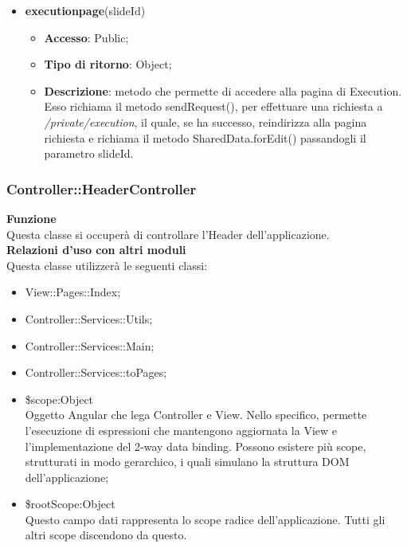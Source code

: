 {{{\begin{itemize}
				\item \textbf{executionpage}(slideId)
				\begin{itemize}
					\item \textbf{Accesso}: Public;
					\item \textbf{Tipo di ritorno}: Object;
					\item \textbf{Descrizione}: metodo che permette di accedere alla pagina di Execution. Esso richiama il metodo sendRequest(), per effettuare una richiesta a \textit{/private/execution}, il quale, se ha successo, reindirizza alla pagina richiesta e richiama il metodo SharedData.forEdit() passandogli il parametro slideId.
				\end{itemize}
			\end{itemize} 
		}
	}

	\subsubsection{Controller::\-HeaderController}
		\label{sub:HeaderController}
		\textbf{Funzione}\\
		\indent Questa classe si occuperà di controllare l'Header dell'applicazione.\\
		\textbf{Relazioni d'uso con altri moduli}\\
		\indent Questa classe utilizzerà le seguenti classi:
		\begin{itemize}
			\item View::\-Pages::\-Index;
			\item Controller::Services::\-Utils;
			\item Controller::Services::\-Main;
			\item Controller::Services::\-toPages;
			\item \$scope:Object\\
				\indent Oggetto Angular che lega Controller e View. Nello specifico, permette l'esecuzione di espressioni che mantengono aggiornata la View e l'implementazione del 2-way data binding. Possono esistere più scope, strutturati in modo gerarchico, i quali simulano la struttura DOM dell'applicazione;
			\item \$rootScope:Object\\
				\indent Questo campo dati rappresenta lo scope radice dell’applicazione. Tutti gli altri scope discendono da questo.
		\end{itemize}

}
